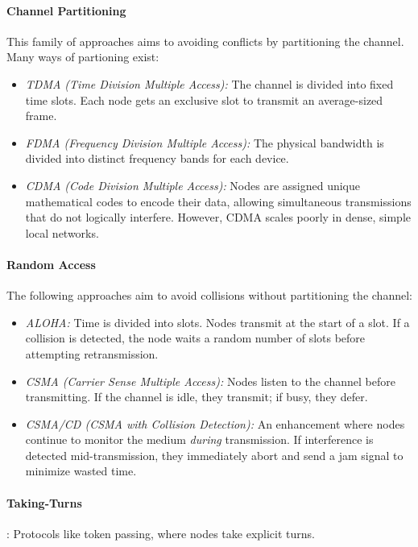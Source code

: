 \paragraph{Channel Partitioning} 
This family of approaches aims to avoiding conflicts by partitioning the channel. Many ways of partioning exist:
    \begin{itemize}
        \item \emph{TDMA (Time Division Multiple Access):} The channel is divided into fixed time slots. Each node gets an exclusive slot to transmit an average-sized frame.
        \item \emph{FDMA (Frequency Division Multiple Access):} The physical bandwidth is divided into distinct frequency bands for each device.
        \item \emph{CDMA (Code Division Multiple Access):} Nodes are assigned unique mathematical codes to encode their data, allowing simultaneous transmissions that do not logically interfere. However, CDMA scales poorly in dense, simple local networks.
    \end{itemize}

\paragraph{Random Access} 
The following approaches aim to avoid collisions without partitioning the channel:
    \begin{itemize}
        \item \emph{ALOHA:} Time is divided into slots. Nodes transmit at the start of a slot. If a collision is detected, the node waits a random number of slots before attempting retransmission.
        \item \emph{CSMA (Carrier Sense Multiple Access):} Nodes listen to the channel before transmitting. If the channel is idle, they transmit; if busy, they defer.
        \item \emph{CSMA/CD (CSMA with Collision Detection):} An enhancement where nodes continue to monitor the medium \emph{during} transmission. If interference is detected mid-transmission, they immediately abort and send a jam signal to minimize wasted time.
    \end{itemize}

\paragraph{Taking-Turns}: Protocols like token passing, where nodes take explicit turns.

